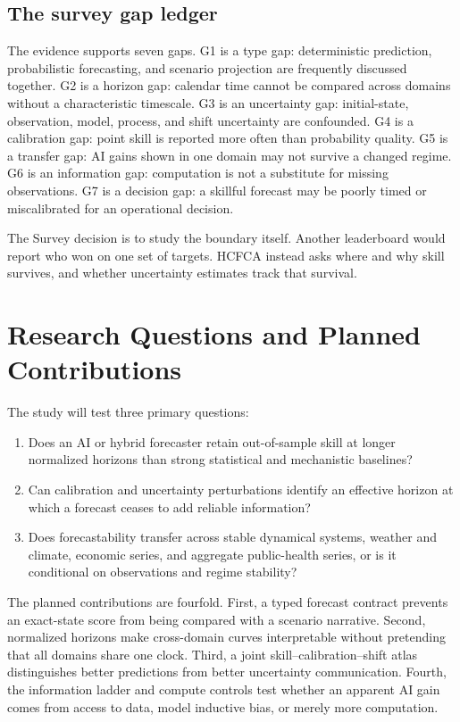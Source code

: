 \documentclass[conference]{IEEEtran}
\begin{document}
\subsection{The survey gap ledger}
The evidence supports seven gaps. G1 is a type gap: deterministic prediction, probabilistic forecasting, and scenario projection are frequently discussed together. G2 is a horizon gap: calendar time cannot be compared across domains without a characteristic timescale. G3 is an uncertainty gap: initial-state, observation, model, process, and shift uncertainty are confounded. G4 is a calibration gap: point skill is reported more often than probability quality. G5 is a transfer gap: AI gains shown in one domain may not survive a changed regime. G6 is an information gap: computation is not a substitute for missing observations. G7 is a decision gap: a skillful forecast may be poorly timed or miscalibrated for an operational decision.

The Survey decision is to study the boundary itself. Another leaderboard would report who won on one set of targets. HCFCA instead asks where and why skill survives, and whether uncertainty estimates track that survival.

\section{Research Questions and Planned Contributions}
The study will test three primary questions:
\begin{enumerate}
\item Does an AI or hybrid forecaster retain out-of-sample skill at longer normalized horizons than strong statistical and mechanistic baselines?
\item Can calibration and uncertainty perturbations identify an effective horizon at which a forecast ceases to add reliable information?
\item Does forecastability transfer across stable dynamical systems, weather and climate, economic series, and aggregate public-health series, or is it conditional on observations and regime stability?
\end{enumerate}

The planned contributions are fourfold. First, a typed forecast contract prevents an exact-state score from being compared with a scenario narrative. Second, normalized horizons make cross-domain curves interpretable without pretending that all domains share one clock. Third, a joint skill--calibration--shift atlas distinguishes better predictions from better uncertainty communication. Fourth, the information ladder and compute controls test whether an apparent AI gain comes from access to data, model inductive bias, or merely more computation.
\end{document}
